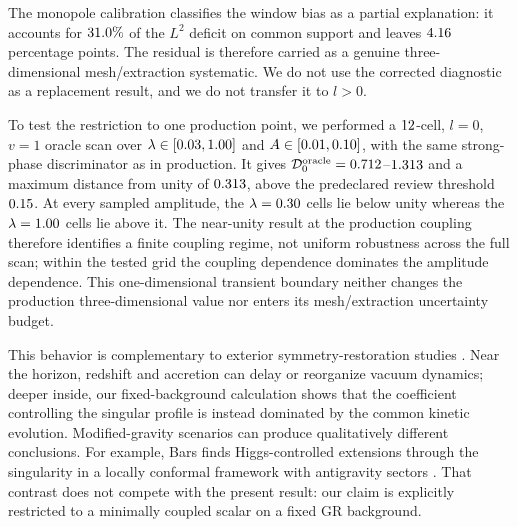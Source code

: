 \documentclass[
  aps,
  prd,
  reprint,
  superscriptaddress,
  nofootinbib,
  longbibliography
]{revtex4-2}
\begin{document}
The monopole calibration classifies the window bias as a partial explanation:
it accounts for $31.0\%$ of the $L^2$ deficit on common
support and leaves $4.16$ percentage points.  The residual
is therefore carried as a genuine three-dimensional mesh/extraction
systematic.  We do not use the corrected diagnostic as a replacement result,
and we do not transfer it to $l>0$.

To test the restriction to one production point, we performed a
$12$-cell, $l=0$, $v=1$ oracle scan over
$\lambda\in[0.03,1.00]$ and
$A\in[0.01,0.10]$, with the same
strong-phase discriminator as in production.
It gives
$\mathcal{D}_{0}^{\mathrm{oracle}}=0.712$--$1.313$
and a maximum distance from unity of $0.313$, above the
predeclared review threshold $0.15$.
At every sampled amplitude, the $\lambda=0.30$ cells
lie below unity whereas the $\lambda=1.00$ cells lie above
it.  The near-unity result at the production coupling therefore identifies a
finite coupling regime, not uniform robustness across the full scan; within
the tested grid the coupling dependence dominates the amplitude dependence.
This one-dimensional transient boundary neither changes the production
three-dimensional value nor enters its mesh/extraction uncertainty budget.

This behavior is complementary to exterior symmetry-restoration studies
\cite{TraykovaBradenPeiris2018,MarsdenEtAl2025}.  Near the horizon, redshift
and accretion can delay or reorganize vacuum dynamics; deeper inside, our
fixed-background calculation shows that the coefficient controlling the
singular profile is instead dominated by the common kinetic evolution.
Modified-gravity scenarios can produce qualitatively different conclusions.
For example, Bars finds Higgs-controlled extensions through the singularity
in a locally conformal framework with antigravity sectors
\cite{Bars2025}.  That contrast does not compete with the present result:
our claim is explicitly restricted to a minimally coupled scalar on a fixed
GR background.
\end{document}
